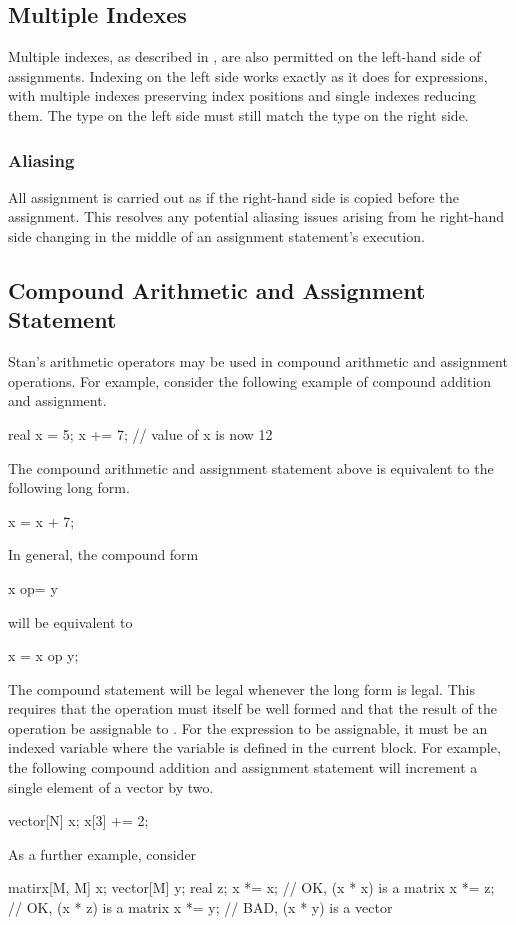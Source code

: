 \subsection{Multiple Indexes}

Multiple indexes, as described in
, are also permitted on the
left-hand side of assignments.  Indexing on the left side works
exactly as it does for expressions, with multiple indexes preserving
index positions and single indexes reducing them.    The type on the
left side must still match the type on the right side.

\subsubsection{Aliasing}

All assignment is carried out as if the right-hand side is copied
before the assignment.  This resolves any potential aliasing issues
arising from he right-hand side changing in the middle of an
assignment statement's execution.


\subsection{Compound Arithmetic and Assignment Statement}\label{compound-arithmetic-assignment.section}

Stan's arithmetic operators may be used in compound arithmetic
and assignment operations.  For example, consider the following
example of compound addition and assignment.
%
\begin{stancode}
real x = 5;
x += 7;  // value of x is now 12
\end{stancode}
%
The compound arithmetic and assignment statement above is equivalent
to the following long form.
%
\begin{stancode}
x = x + 7;
\end{stancode}
%
In general, the compound form
%
\begin{stancode}
x op= y
\end{stancode}
%
will be equivalent to
%
\begin{stancode}
x = x op y;
\end{stancode}
%
The compound statement will be legal whenever the long form is legal.
This requires that the operation  must itself be well
formed and that the result of the operation be assignable to .
For the expression  to be assignable, it must be an indexed
variable where the variable is defined in the current block.  For
example, the following compound addition and assignment statement will
increment a single element of a vector by two.
%
\begin{stancode}
vector[N] x;
x[3] += 2;
\end{stancode}
%
As a further example, consider
%
\begin{stancode}
matirx[M, M] x;
vector[M] y;
real z;
x *= x;  // OK, (x * x) is a matrix
x *= z;  // OK, (x * z) is a matrix
x *= y;  // BAD, (x * y) is a vector
\end{stancode}

